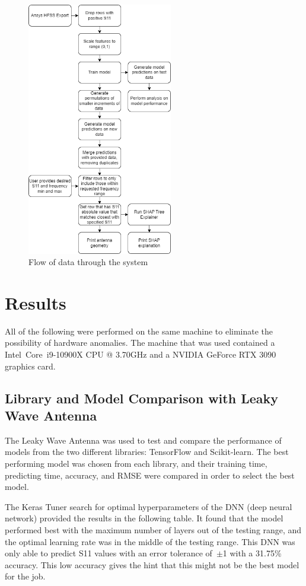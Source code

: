 \documentclass[lettersize,journal]{IEEEtran}
\begin{document}
\begin{figure}[!t]
\centering
\includegraphics[width=2.5in]{methodology}
\caption{Flow of data through the system}
\label{fig_sim}
\end{figure}


\section{Results}
All of the following were performed on the same machine to eliminate the possibility of hardware anomalies. The machine that was used contained a  Intel\textregistered~Core\texttrademark~i9-10900X CPU @ 3.70GHz and a NVIDIA GeForce RTX 3090 graphics card. 

\subsection{Library and Model Comparison with Leaky Wave Antenna}
The Leaky Wave Antenna was used to test and compare the performance of models from the two different libraries: TensorFlow and Scikit-learn. The best performing model was chosen from each library, and their training time, predicting time, accuracy, and RMSE were compared in order to select the best model.

The Keras Tuner search for optimal hyperparameters of the DNN (deep neural network) provided the results in the following table. It found that the model performed best with the maximum number of layers out of the testing range, and the optimal learning rate was in the middle of the testing range. This DNN was only able to predict S11 values with an error tolerance of~$\pm$1 with a 31.75\% accuracy. This low accuracy gives the hint that this might not be the best model for the job.
\end{document}
